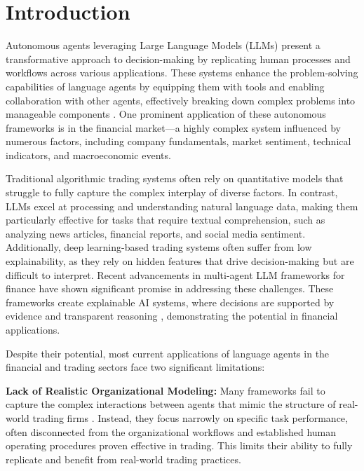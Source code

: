 \section{Introduction}
Autonomous agents leveraging Large Language Models (LLMs) present a transformative approach to decision-making by replicating human processes and workflows across various applications. These systems enhance the problem-solving capabilities of language agents by equipping them with tools and enabling collaboration with other agents, effectively breaking down complex problems into manageable components \citep{park2023generativeagentsinteractivesimulacra, havrilla2024teachinglargelanguagemodels, talebirad2023multiagentcollaborationharnessingpower, tang2024medagentslargelanguagemodels}. One prominent application of these autonomous frameworks is in the financial market—a highly complex system influenced by numerous factors, including company fundamentals, market sentiment, technical indicators, and macroeconomic events.

Traditional algorithmic trading systems often rely on quantitative models that struggle to fully capture the complex interplay of diverse factors. In contrast, LLMs excel at processing and understanding natural language data, making them particularly effective for tasks that require textual comprehension, such as analyzing news articles, financial reports, and social media sentiment. Additionally, deep learning-based trading systems often suffer from low explainability, as they rely on hidden features that drive decision-making but are difficult to interpret. Recent advancements in multi-agent LLM frameworks for finance have shown significant promise in addressing these challenges. These frameworks create explainable AI systems, where decisions are supported by evidence and transparent reasoning \citep{li2023tradinggpt, wang2024quantagentseekingholygrail, yu2024fincon}, demonstrating the potential in financial applications.

Despite their potential, most current applications of language agents in the financial and trading sectors face two significant limitations:

\textbf{Lack of Realistic Organizational Modeling:} Many frameworks fail to capture the complex interactions between agents that mimic the structure of real-world trading firms \citep{li2023tradinggpt, wang2024quantagentseekingholygrail, yu2024fincon}. Instead, they focus narrowly on specific task performance, often disconnected from the organizational workflows and established human operating procedures proven effective in trading. This limits their ability to fully replicate and benefit from real-world trading practices.

